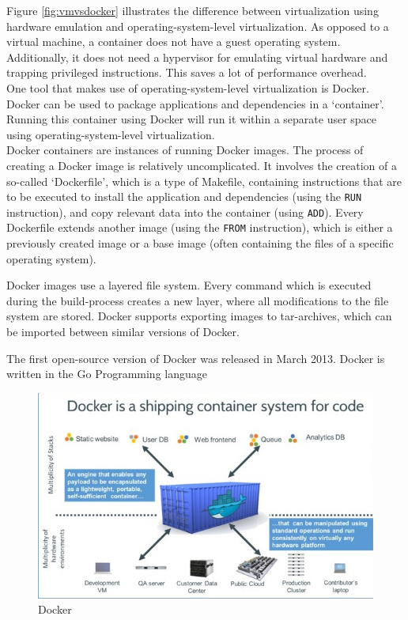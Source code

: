 Figure \ref{fig:vmvsdocker} illustrates the difference between virtualization using hardware emulation and operating-system-level virtualization. As opposed to a virtual machine, a container does not have a guest operating system. Additionally, it does not need a hypervisor for emulating virtual hardware and trapping privileged instructions. This saves a lot of performance overhead. \\

One tool that makes use of operating-system-level virtualization is Docker. Docker can be used to package applications and dependencies in a `container'. Running this container using Docker will run it within a separate user space using operating-system-level virtualization. \\
Docker containers are instances of running Docker images. The process of creating a Docker image is relatively uncomplicated. It involves the creation of a so-called `Dockerfile', which is a type of Makefile, containing instructions that are to be executed to install the application and dependencies (using the \verb|RUN| instruction), and copy relevant data into the container (using \verb|ADD|). Every Dockerfile extends another image (using the \verb|FROM| instruction), which is either a previously created image or a base image (often containing the files of a specific operating system).

Docker images use a layered file system. Every command which is executed during the
build-process creates a new layer, where all modifications to the file system are stored.
Docker supports exporting images to tar-archives, which can be imported between similar versions of Docker.

The first open-source version of Docker was released in March 2013. Docker is written in the Go Programming language \\



\begin{figure}[H]
\centering
\includegraphics[scale=0.8]{images/docker_container.jpeg}
\caption{Docker}
\label{fig:analysis-mvc}
\end{figure}

